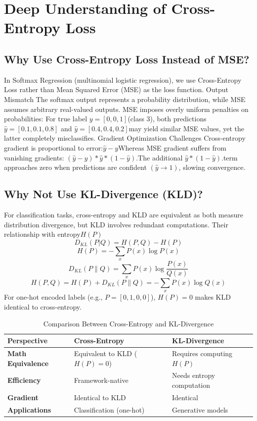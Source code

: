 \documentclass[conference]{IEEEtran}
\begin{document}
\section{Deep Understanding of Cross-Entropy Loss}
\subsection{Why Use Cross-Entropy Loss Instead of MSE?}
In Softmax Regression (multinomial logistic regression), we use Cross-Entropy Loss rather than Mean Squared Error (MSE) as the loss function.
Output Mismatch
The softmax output represents a probability distribution, while MSE assumes arbitrary real-valued outputs. MSE imposes overly uniform penalties on probabilities:
For true label $y=[0,0,1]$(class 3), both predictions $\hat{y}=[0.1,0.1,0.8]$ and $\hat{y}=[0.4,0.4,0.2]$may yield similar MSE values, yet the latter completely misclassifies.
Gradient Optimization Challenges
Cross-entropy gradient is proportional to error:$\hat{y}-y$Whereas MSE gradient suffers from vanishing gradients: $(\hat{y}-y)*\hat{y}*(1-\hat{y})$.The additional $\hat{y}*(1-\hat{y})$.term approaches zero when predictions are confident $(\hat{y} \to 1)$, slowing convergence.
\subsection{Why Not Use KL-Divergence (KLD)?}
For classification tasks, cross-entropy and KLD are equivalent as both measure distribution divergence, but KLD involves redundant computations. Their relationship with entropy${H(P)}$
$$
D_{KL}(P|Q)=H(P,Q)- H(P)
$$
$$
H ( P )=-\sum_{x} P ( x ) \operatorname{l o g} P ( x )
$$
$$
D_{K L} ( P \| Q )=\sum_{x} P ( x ) \operatorname{l o g} \frac{P ( x )} {Q ( x )}
$$
$$
H ( P, Q )=H ( P )+D_{K L} ( P \| Q )=-\sum_{x} P ( x ) \operatorname{l o g} Q ( x )
$$
For one-hot encoded labels (e.g., $P=[0,1,0,0]$), $H(P)=0$ makes KLD identical to cross-entropy.

\begin{table}[!t]
\caption{Comparison Between Cross-Entropy and KL-Divergence}
\label{tab:ce_vs_kld}
\centering
\setlength{\tabcolsep}{4pt} %
\begin{tabular}{|p{}|p{}|p{}|}
\hline
\textbf{Perspective} & \textbf{Cross-Entropy} & \textbf{KL-Divergence} \\ 
\hline 
\textbf{Math Equivalence} & 
Equivalent to KLD ($H(P)\!=\!0$) & 
Requires computing $H(P)$ \\
\hline 
\textbf{Efficiency} & 
Framework-native & 
Needs entropy computation \\
\hline 
\textbf{Gradient} & 
Identical to KLD & 
Identical \\
\hline 
\textbf{Applications} & 
Classification (one-hot) & 
Generative models \\
\hline
\end{tabular}
\end{table}
\end{document}
